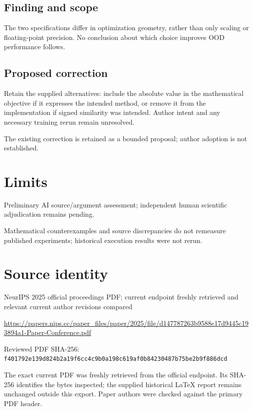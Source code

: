 \documentclass[11pt]{article}
\begin{document}
\subsection*{Finding and scope}

The two specifications differ in optimization geometry, rather than only scaling or floating-point precision. No conclusion about which choice improves OOD performance follows.

\subsection*{Proposed correction}

Retain the supplied alternatives: include the absolute value in the mathematical objective if it expresses the intended method, or remove it from the implementation if signed similarity was intended. Author intent and any necessary training rerun remain unresolved.

The existing correction is retained as a bounded proposal; author adoption is not established.

\section*{Limits}

Preliminary AI source/argument assessment; independent human scientific adjudication remains pending.\par

Mathematical counterexamples and source discrepancies do not remeasure published experiments; historical execution results were not rerun.\par

\section*{Source identity}

NeurIPS 2025 official proceedings PDF; current endpoint freshly retrieved and relevant current author revisions compared

\url{https://papers.nips.cc/paper_files/paper/2025/file/d147787263b9588e17d9445c193894a1-Paper-Conference.pdf}

Reviewed PDF SHA-256: \nolinkurl{f401792e139d824b2a19f6cc4c9b0a198c619af0b84230487b75be2b9f886dcd}

The exact current PDF was freshly retrieved from the official endpoint. Its SHA-256 identifies the bytes inspected; the supplied historical LaTeX report remains unchanged outside this export. Paper authors were checked against the primary PDF header.
\end{document}
